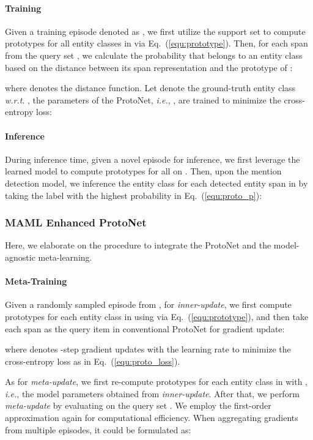 \documentclass[11pt]{article}
\newcommand\ie{\textit{i.e.}}
\newcommand\wrt{\textit{w.r.t}}
\begin{document}
\paragraph{Training} 
Given a training episode denoted as ,
we first utilize the support set  to compute prototypes for all entity classes in  via Eq.~(\ref{equ:prototype}).
Then, for each span  from the query set , we calculate the probability that  belongs to an entity class  based on the distance between its span representation  and the prototype of :

where  denotes the distance function.
Let  denote the ground-truth entity class \wrt. , the parameters of the ProtoNet, \ie, , are trained to minimize the cross-entropy loss:


\paragraph{Inference} During inference time, given a novel episode  for inference,
we first leverage the learned model to compute prototypes for all  on .
Then, upon the mention detection model, we inference the entity class for each detected entity span  in  by taking the label  with the highest probability in Eq.~(\ref{equ:proto_p}):


\subsubsection{MAML Enhanced ProtoNet}
Here, we elaborate on the procedure to integrate the ProtoNet and the model-agnostic meta-learning. 

\paragraph{Meta-Training} Given a randomly sampled episode  from ,
for \textit{inner-update}, we first compute prototypes for each entity class in  using  via Eq.~(\ref{equ:prototype}), and then take each span  as the query item in conventional ProtoNet for gradient update:

where  denotes -step gradient updates with the learning rate  to minimize the cross-entropy loss  as in Eq.~(\ref{equ:proto_loss}).

As for \textit{meta-update}, we first re-compute prototypes for each entity class in  with , \ie, the model parameters obtained from \textit{inner-update}.
After that, we perform \textit{meta-update} by evaluating  on the query set .
We employ the first-order approximation again for computational efficiency.
When aggregating gradients from multiple episodes, it could be formulated as:
\end{document}
